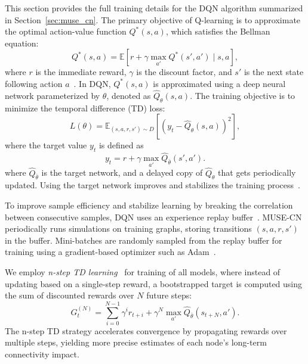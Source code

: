 \documentclass{article}
\begin{document}
This section provides the full training details for the DQN algorithm summarized in Section~\ref{sec:muse_cn}. The primary objective of Q-learning is to approximate the optimal action-value function $Q^*(s,a)$, which satisfies the Bellman equation:
\begin{equation}
    Q^*(s, a) = \mathbb{E}\left[r + \gamma \max_{a'} Q^*(s', a') \mid s, a \right],
\end{equation}
where $r$ is the immediate reward, $\gamma$ is the discount factor, and $s'$ is the next state following action $a$~\cite{sutton2018reinforcement}. In DQN, $Q^*(s, a)$ is approximated using a deep neural network parameterized by $\theta$, denoted as $\hat{Q}_{\theta}(s, a)$. The training objective is to minimize the temporal difference (TD) loss:
\begin{equation}
    L(\theta) = \mathbb{E}_{(s, a, r, s') \sim D} \left[ \left(y_t - \hat{Q}_{\theta}(s, a)\right)^2 \right],
\end{equation}
where the target value $y_t$ is defined as
\begin{equation}
    y_t = r + \gamma \max_{a'} \hat{Q}_{\bar{\theta}}(s', a').
\end{equation}
where $\hat{Q}_{\bar{\theta}}$ is the target network, and a delayed copy of $\hat{Q}_{\theta}$ that gets periodically updated. Using the target network improves and stabilizes the training process~\cite{mnih2015human}.

To improve sample efficiency and stabilize learning by breaking the correlation between consecutive samples, DQN uses an experience replay buffer~\cite{mnih2015human}. MUSE-CN periodically runs simulations on training graphs, storing transitions $(s, a, r, s')$ in the buffer. Mini-batches are randomly sampled from the replay buffer for training using a gradient-based optimizer such as Adam~\cite{kingma2014adam}.

We employ \emph{n-step TD learning}~\cite{sutton2018reinforcement} for training of all models, where instead of updating based on a single-step reward, a bootstrapped target is computed using the sum of discounted rewards over $N$ future steps:
\begin{equation}
    G_t^{(N)} = \sum_{i=0}^{N-1} \gamma^i r_{t+i} + \gamma^N \max_{a'} \hat{Q}_{\bar{\theta}}(s_{t+N}, a').
\end{equation}
The n-step TD strategy accelerates convergence by propagating rewards over multiple steps, yielding more precise estimates of each node's long-term connectivity impact.
\end{document}
